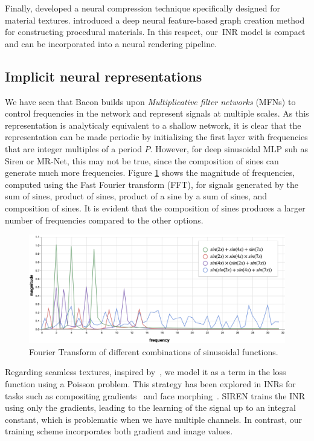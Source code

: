 Finally, \citet{ntc2023}
developed a neural compression technique specifically designed for material textures. \citet{match}
introduced a deep neural feature-based graph creation method for constructing procedural materials.
In this respect, our~INR model is compact and can be incorporated into a neural rendering pipeline.

\subsection{Implicit neural representations}

We have seen that Bacon \cite{bacon2021} builds upon \textit{Multiplicative filter networks} (MFNs) \cite{fathony2020multiplicative} to control frequencies in the network and represent signals at multiple scales. As this representation is analyticaly equivalent to a shallow network, it is clear that the representation can be made periodic by initializing the first layer with frequencies that are integer multiples of a period $P$. However, for deep sinusoidal MLP suh as Siren or MR-Net, this may not be true, since the composition of sines can generate much more frequencies. Figure \ref{f:generated-frequencies} shows the magnitude of frequencies, computed using the Fast Fourier transform (FFT), for signals generated by the sum of sines, product of sines, product of a sine by a sum of sines, and composition of sines. It is evident that the composition of sines produces a larger number of frequencies compared to the other options.

\begin{figure}[h]
\centering
\includegraphics[width=0.60\linewidth]{img/ch6/generated_frequencies.png}
\caption{Fourier Transform of different combinations of sinusoidal functions.}
\label{f:generated-frequencies}
\end{figure}
    

Regarding seamless textures, inspired by~\cite{perez2023poisson}, we model it as a term in the loss function using a Poisson problem. 
This strategy has been explored in INRs for tasks such as compositing gradients~\cite{sitzmann2019siren} and face morphing~\cite{schardong2023neural}. SIREN trains the INR using only the gradients, leading to the learning of the signal up to an integral constant, which is problematic when we have multiple channels. In contrast, our training scheme incorporates both gradient and image values.


